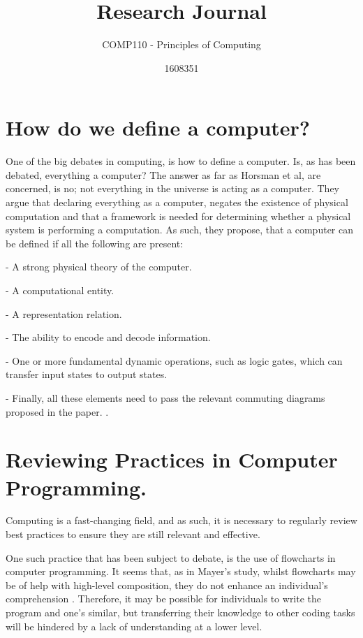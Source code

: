 \documentclass{scrartcl}
\title{Research Journal}
\subtitle{COMP110 - Principles of Computing}
\author{1608351}
\begin{document}
\maketitle

\section{How do we define a computer?}

One of the big debates in computing, is how to define a computer. Is, as has been debated, everything a computer? The answer as far as Horsman et al, are concerned, is no; not everything in the universe is acting as a computer. They argue that declaring everything as a computer, negates the existence of physical computation and that a framework is needed for determining whether a physical system is performing a computation. As such, they propose, that a computer can be defined if all the following are present:

- A strong physical theory of the computer.

- A computational entity.

- A representation relation.

- The ability to encode and decode information.

- One or more fundamental dynamic operations, such as logic gates, which can transfer input states to output states. 

- Finally, all these elements need to pass the relevant commuting diagrams proposed in the paper. \cite{Horsman2014}. 


\section{Reviewing Practices in Computer Programming.}

Computing is a fast-changing field, and as such, it is necessary to regularly review best practices to ensure they are still relevant and effective. 

One such practice that has been subject to debate, is the use of flowcharts in computer programming. It seems that, as in Mayer's study, whilst flowcharts may be of help with high-level composition, they do not enhance an individual’s comprehension \cite{Mayer}. Therefore, it may be possible for individuals to write the program and one’s similar, but transferring their knowledge to other coding tasks will be hindered by a lack of understanding at a lower level. 
\end{document}
